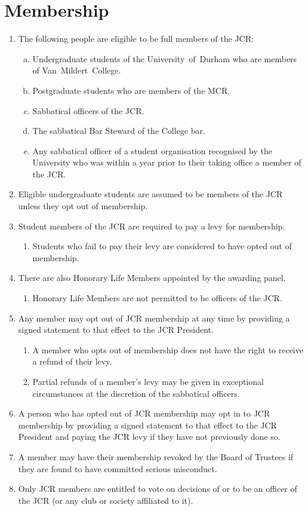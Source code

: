 \documentclass[12pt]{article}
\begin{document}
\section{Membership}
\begin{enumerate}
    \item The following people are eligible to be full members of the JCR:
    \begin{enumerate}[(a)]
        \item Undergraduate students of the University~of~Durham who are members of Van~Mildert~College.
        \item Postgraduate students who are members of the MCR.
        \item Sabbatical officers of the JCR.
        \item The sabbatical Bar Steward of the College bar.
        \item Any sabbatical officer of a student organisation recognised by the University who was within a year prior to their taking office a member of the JCR.
    \end{enumerate}
    \item Eligible undergraduate students are assumed to be members of the JCR unless they opt out of membership.
    \item Student members of the JCR are required to pay a levy for membership.
    \begin{enumerate}
        \item Students who fail to pay their levy are considered to have opted out of membership.
    \end{enumerate}
    \item There are also Honorary Life Members appointed by the awarding panel.
    \begin{enumerate}
        \item Honorary Life Members are not permitted to be officers of the JCR.
    \end{enumerate}
    \item Any member may opt out of JCR membership at any time by providing a signed statement to that effect to the JCR President.
    \begin{enumerate}
        \item A member who opts out of membership does not have the right to receive a refund of their levy.
        \item Partial refunds of a member's levy may be given in exceptional circumstances at the discretion of the sabbatical officers.
    \end{enumerate}
    \item A person who has opted out of JCR membership may opt in to JCR membership by providing a signed statement to that effect to the JCR President and paying the JCR levy if they have not previously done so.
    \item A member may have their membership revoked by the Board of Trustees if they are found to have committed serious misconduct.
    \item Only JCR members are entitled to vote on decisions of or to be an officer of the JCR (or any club or society affiliated to it).
\end{enumerate}
\newpage
\end{document}

